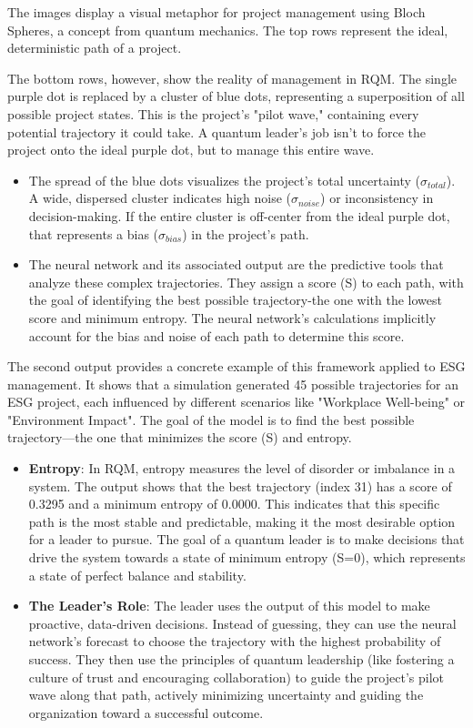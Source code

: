 \documentclass{article}
\begin{document}
The images display a visual metaphor for project management using Bloch Spheres, a concept from quantum mechanics. The top rows represent the ideal, deterministic path of a project. 

The bottom rows, however, show the reality of management in RQM. The single purple dot is replaced by a cluster of blue dots, representing a superposition of all possible project states. This is the project's "pilot wave," containing every potential trajectory it could take. A quantum leader's job isn't to force the project onto the ideal purple dot, but to manage this entire wave.
\begin{itemize}
\item The spread of the blue dots visualizes the project's total uncertainty ($\sigma_{total}$). A wide, dispersed cluster indicates high noise ($\sigma_{noise}$) or inconsistency in decision-making. If the entire cluster is off-center from the ideal purple dot, that represents a bias ($\sigma_{bias}$) in the project's path.
\item The neural network and its associated output are the predictive tools that analyze these complex trajectories. They assign a score (S) to each path, with the goal of identifying the best possible trajectory-the one with the lowest score and minimum entropy. The neural network's calculations implicitly account for the bias and noise of each path to determine this score.
\end{itemize}

The second output provides a concrete example of this framework applied to ESG management. It shows that a simulation generated 45 possible trajectories for an ESG project, each influenced by different scenarios like "Workplace Well-being" or "Environment Impact". The goal of the model is to find the best possible trajectory---the one that minimizes the score (S) and entropy.
\begin{itemize}
\item \textbf{Entropy}: In RQM, entropy measures the level of disorder or imbalance in a system. The output shows that the best trajectory (index 31) has a score of 0.3295 and a minimum entropy of 0.0000. This indicates that this specific path is the most stable and predictable, making it the most desirable option for a leader to pursue. The goal of a quantum leader is to make decisions that drive the system towards a state of minimum entropy (S=0), which represents a state of perfect balance and stability.
\item \textbf{The Leader's Role}: The leader uses the output of this model to make proactive, data-driven decisions. Instead of guessing, they can use the neural network's forecast to choose the trajectory with the highest probability of success. They then use the principles of quantum leadership (like fostering a culture of trust and encouraging collaboration) to guide the project's pilot wave along that path, actively minimizing uncertainty and guiding the organization toward a successful outcome.
\end{itemize}
\end{document}
